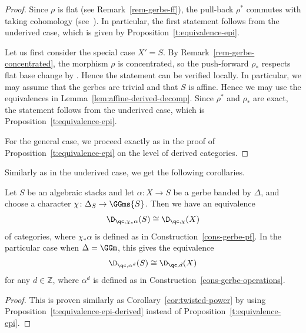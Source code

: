 \begin{proof}
Since $\rho$ is flat (see Remark~\ref{rem-gerbe-ff}),
the pull-back $\rho^*$ commutes with
taking cohomology (see~\cite[Equation~(1.9)]{hr2017}).
In particular,
the first statement follows from the underived case,
which is given by Proposition~\ref{t:equivalence-epi}.

Let us first consider the special case $X' = S$.
By Remark~\ref{rem-gerbe-concentrated}, the morphism $\rho$ is concentrated,
so the push-forward $\rho_*$ respects flat base change by \cite[Theorem~2.6(4)]{hr2017}.
Hence the statement can be verified locally.
In particular, we may assume that the gerbes are trivial and that $S$ is affine.
Hence we may use the equivalences in Lemma~\ref{lem:affine-derived-decomp}.
Since $\rho^*$ and $\rho_*$ are exact,
the statement follows from the underived case,
which is Proposition~\ref{t:equivalence-epi}.

For the general case, we proceed exactly as in
the proof of Proposition~\ref{t:equivalence-epi} on the level of derived
categories.
\end{proof}

Similarly as in the underived case, we get the following corollaries.
\begin{corollary}
\label{cor:twisted-power-derived}
Let $S$ be an algebraic stacks and let $\alpha\colon X \to S$ be a gerbe banded by $\Delta$,
and choose a character $\chi\colon \Delta_S \to \GGms{S}$.
Then we have an equivalence
\begin{equation*}
\D_{\qc,\chi_*\alpha}(S)\cong \D_{\qc, \chi}(X) 
\end{equation*}
of categories, where $\chi_*\alpha$ is defined as in Construction~\ref{cons-gerbe-pf}.
In the particular case when $\Delta = \GGm$,
this gives the equivalence
\begin{equation*}
\D_{\qc,\alpha^d}(S)\cong \D_{\qc,d}(X) 
\end{equation*}
for any $d \in \mathbb{Z}$, where $\alpha^d$ is defined as in Construction~\ref{cons-gerbe-operations}.
\end{corollary}
\begin{proof}
This is proven similarly as Corollary~\ref{cor:twisted-power} by using Proposition~\ref{t:equivalence-epi-derived}
instead of Proposition~\ref{t:equivalence-epi}.
\end{proof}

